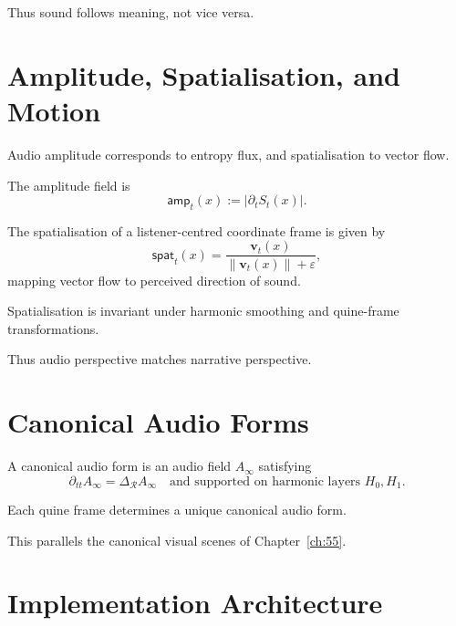 Thus sound follows meaning, not vice versa.


\section{Amplitude, Spatialisation, and Motion}
\label{sec:56:spatial}

Audio amplitude corresponds to entropy flux, and spatialisation to vector flow.

\begin{definition}
The amplitude field is
\[
\mathsf{amp}_t(x) := |\partial_t S_t(x)|.
\]
\end{definition}

\begin{definition}
The spatialisation of a listener-centred coordinate frame is given by
\[
\mathsf{spat}_t(x) =
\frac{\mathbf{v}_t(x)}{\|\mathbf{v}_t(x)\| + \varepsilon},
\]
mapping vector flow to perceived direction of sound.
\end{definition}

\begin{theorem}
Spatialisation is invariant under harmonic smoothing and quine-frame
transformations.
\end{theorem}

Thus audio perspective matches narrative perspective.


\section{Canonical Audio Forms}
\label{sec:56:canonical}

\begin{definition}
A canonical audio form is an audio field $A_\infty$ satisfying
\[
\partial_{tt} A_\infty = \Delta_{\mathcal{R}} A_\infty
\quad
\text{and supported on harmonic layers $H_0,H_1$.}
\]
\end{definition}

\begin{theorem}
Each quine frame determines a unique canonical audio form.
\end{theorem}

This parallels the canonical visual scenes of Chapter~\ref{ch:55}.


\section{Implementation Architecture}
\label{sec:56:architecture}

